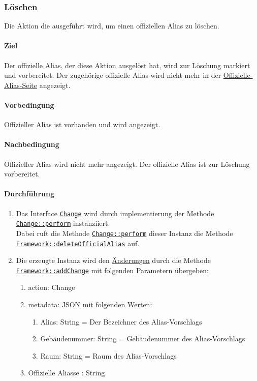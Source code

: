 \subsubsection{Löschen}\label{AP_Aktionen_Offizielle_Aliasse_Loschen}

Die Aktion die ausgeführt wird, um einen offiziellen Alias zu löschen.

\paragraph*{Ziel}
Der offizielle Alias, der diese Aktion ausgelöst hat, wird zur Löschung markiert und vorbereitet.
Der zugehörige offizielle Alias wird nicht mehr in der \hyperref[AP_Offizielle_Aliasse]{Offizielle-Alias-Seite} angezeigt.

\paragraph*{Vorbedingung}
Offizieller Alias ist vorhanden und wird angezeigt.

\paragraph*{Nachbedingung}
Offizieller Alias wird nicht mehr angezeigt. Der offizielle Alias ist zur Löschung vorbereitet.

\paragraph*{Durchführung}
\begin{enumerate}
    \item Das Interface \hyperref[AP_Change]{\texttt{Change}} wird durch implementierung der Methode \hyperref[AP_Change_perform]{\texttt{Change::perform}} instanziiert. \\
          Dabei ruft die Methode \hyperref[AP_Change_perform]{\texttt{Change::perform}} dieser Instanz die Methode \\
          \hyperref[AP_Framework_deleteOfficialAlias]{\texttt{Framework::deleteOfficialAlias}} auf.
    \item Die erzeugte Instanz wird den \hyperref[AP_Changes]{Änderungen} durch die Methode \hyperref[AP_Framework_addChange]{\texttt{Framework::addChange}} mit folgenden Parametern übergeben: \begin{enumerate}
        \item action: Change
        \item metadata: JSON mit folgenden Werten: \begin{enumerate}
            \item Alias: String = Der Bezeichner des Alias-Vorschlags
            \item Gebäudenummer: String = Gebäudenummer des Alias-Vorschlags
            \item Raum: String = Raum des Alias-Vorschlags
        \end{enumerate}
        \item \dq Offizielle Aliasse \dq: String
    \end{enumerate}
\end{enumerate}
